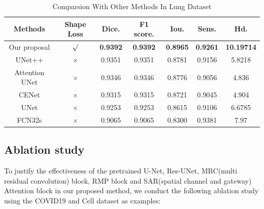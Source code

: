 \documentclass[UTF8]{article} %
\begin{document}
  \begin{table}[H]
    \vspace{-2mm}
    \begin{center}\small
    \caption{Comparsion With Other Methods In Lung\cite{covid19_2} Dataset}
    \label{lung-table}
    \begin{tabular}{ccccccc}
      
    \toprule
    Methods & Shape Loss & Dice. & F1 score. & Iou. & Sens. & Hd.\\
    \midrule
      Our proposal & $\surd$ & \textbf{0.9392} & \textbf{0.9392} & \textbf{0.8965} & \textbf{0.9261} & \textbf{10.19714}\\
      UNet++ & $\times$ & 0.9351 & 0.9351 & 0.8781 & 0.9156 & 5.8218\\
      Attention UNet & $\times$ & 0.9346 & 0.9346 & 0.8776 & 0.9056 & 4.836\\
      CENet & $\times$ & 0.9315 & 0.9315 & 0.8721 & 0.9045 & 4.904\\
      UNet & $\times$ & 0.9253 & 0.9253 & 0.8615 & 0.9106 & 6.6785\\
      FCN32s & $\times$ & 0.9065 & 0.9065 & 0.8300 & 0.9381 & 7.97\\
  \bottomrule    
    \end{tabular}
    \end{center}
    \vspace{-4mm}
  \end{table}
  


  \subsection{Ablation study}
  To justify the effectiveness of the pretrained U-Net\cite{unet}, Res-UNet\cite{ResUNet}, 
  MRC(multi residual convolution) block, RMP block and SAR(spatial channel and gateway) Attention block
  in our proposed method, we conduct the following ablation study using the COVID19 and Cell dataset as examples:
\end{document}
